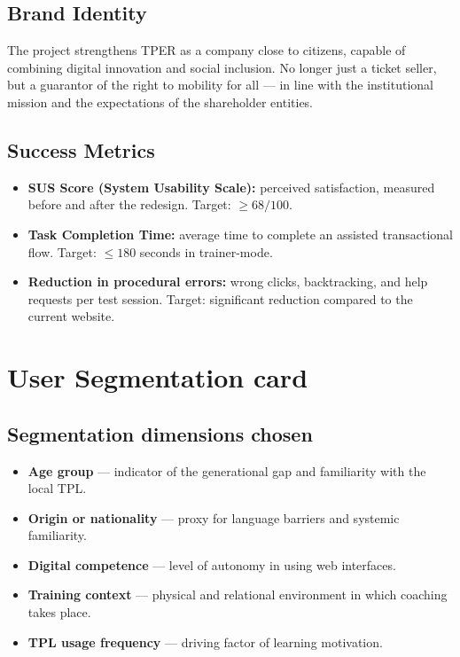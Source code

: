 ﻿\documentclass[11pt,a4paper]{article}
\begin{document}
\subsection{Brand Identity}
The project strengthens TPER as a company close to citizens, capable of
combining digital innovation and social inclusion. No longer just a ticket
seller, but a guarantor of the right to mobility for all --- in line with
the institutional mission and the expectations of the shareholder entities.

\subsection{Success Metrics}
\begin{itemize}[leftmargin=*]
    \item \textbf{SUS Score (System Usability Scale):}
    perceived satisfaction, measured before and after the redesign.
    Target: $\geq 68/100$.

    \item \textbf{Task Completion Time:}
    average time to complete an assisted transactional flow.
    Target: $\leq 180$ seconds in trainer-mode.

    \item \textbf{Reduction in procedural errors:}
    wrong clicks, backtracking, and help requests per test session.
    Target: significant reduction compared to the current website.
\end{itemize}

\newpage
\section{User Segmentation card}

\subsection{Segmentation dimensions chosen}

\begin{tcolorbox}[base]
\begin{itemize}[leftmargin=*,itemsep=4pt]
    \item \textbf{Age group} --- indicator of the generational gap
    and familiarity with the local TPL.
    \item \textbf{Origin or nationality} --- proxy for language
    barriers and systemic familiarity.
    \item \textbf{Digital competence} --- level of autonomy
    in using web interfaces.
    \item \textbf{Training context} --- physical and
    relational environment in which coaching takes place.
    \item \textbf{TPL usage frequency} --- driving factor
    of learning motivation.
\end{itemize}
\end{tcolorbox}
\end{document}
